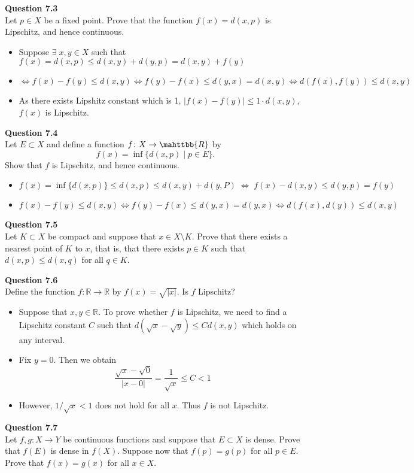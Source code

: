 \documentclass[12pt]{article}
\begin{document}
\newpage                                                                                          
\textbf{Question 7.3}\\
Let $p\in X$ be a fixed point. Prove that the function $f(x)=d(x,p)$ is Lipschitz, and hence continuous.
\begin{itemize}
    \item Suppose $\exists\;x,y\in X$ such that $f(x) = d(x,p) \le d(x,y)+d(y,p) = d(x,y)+ f(y)$
    \item$\Leftrightarrow f(x)-f(y) \le d(x,y) \Leftrightarrow f(y)-f(x) \le d(y,x)=d(x,y)
    \Leftrightarrow d(f(x),f(y)) \le d(x,y)$
    \item As there exists Lipshitz constant which is 1, $|f(x)-f(y)|\le 1\cdot d(x,y)$, $f(x)$ is Lipschitz.
    
\end{itemize}

\vspace{1.5\baselineskip}
\textbf{Question 7.4}\\
Let $E\subset X$ and define a function $f\colon X\rightarrow \mahttbb{R}$ by $$f(x) = \inf\{d(x,p)\;|\;p\in E\}.$$
Show that $f$ is Lipschitz, and hence continuous.
\begin{itemize}
    
    
    \item $f(x) = \inf\{d(x,p)\} \le d(x,p) \le d(x,y)+d(y,P)\;\Leftrightarrow\;f(x)-d(x,y)\le d(y,p)=f(y)$
    \item $f(x)-f(y)\le d(x,y) \Leftrightarrow f(y)-f(x) \le d(y,x)=d(y,x) \Leftrightarrow d(f(x),d(y)) \le d(x,y)$
\end{itemize}


\vspace{1.5\baselineskip}
\textbf{Question 7.5}\\
Let $K\subset X$ be compact and suppose that $x\in X\setminus K$. Prove that there exists a nearest point of $K$ to $x$, that is, that there exists $p\in K$ such that $d(x,p)\le d(x,q)$ for all $q\in K$.

\vspace{1.5\baselineskip}
\textbf{Question 7.6}\\
Define the function $f\colon\mathbb{R}\rightarrow\mathbb{R}$ by $f(x)=\sqrt{|x|}$. Is $f$ Lipschitz?
\begin{itemize}
    \item Suppose that $x,y\in \mathbb{R}$. To prove whether $f$ is Lipschitz, we need to find a Lipschitz constant $C$ such that $d(\sqrt{x}-\sqrt{y})\le Cd(x,y)$ which holds on any interval.
    \item Fix $y=0$. Then we obtain 
    $$\frac{\sqrt{x}-\sqrt{0}}{|x-0|} = \frac{1}{\sqrt{x}} \le C <1$$
    \item However, $1/\sqrt{x} < 1$ does not hold for all $x$. Thus $f$ is not Lipschitz.
\end{itemize}
\vspace{1.5\baselineskip}
\textbf{Question 7.7}\\
Let $f,g: X\rightarrow Y$ be continuous functions and suppose that $E\subset X$ is dense. Prove that $f(E)$ is dense in $f(X)$. Suppose now that $f(p) = g(p)$ for all $p\in E$. Prove that $f(x)=g(x)$ for all $x\in X$.
\end{document}
